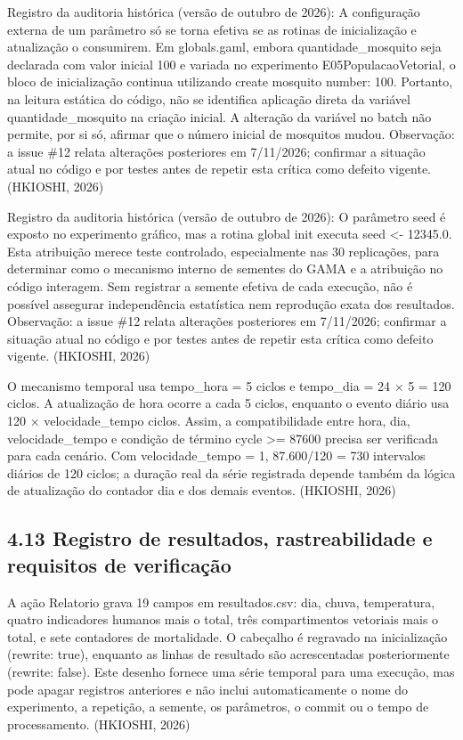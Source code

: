 Registro da auditoria histórica (versão de outubro de 2026): A
configuração externa de um parâmetro só se torna efetiva se as rotinas
de inicialização e atualização o consumirem. Em globals.gaml, embora
quantidade\_mosquito seja declarada com valor inicial 100 e variada no
experimento E05PopulacaoVetorial, o bloco de inicialização continua
utilizando create mosquito number: 100. Portanto, na leitura estática do
código, não se identifica aplicação direta da variável
quantidade\_mosquito na criação inicial. A alteração da variável no
batch não permite, por si só, afirmar que o número inicial de mosquitos
mudou. Observação: a issue \#12 relata alterações posteriores em
7/11/2026; confirmar a situação atual no código e por testes antes de
repetir esta crítica como defeito vigente. (HKIOSHI, 2026)

Registro da auditoria histórica (versão de outubro de 2026): O parâmetro
seed é exposto no experimento gráfico, mas a rotina global init executa
seed \textless- 12345.0. Esta atribuição merece teste controlado,
especialmente nas 30 replicações, para determinar como o mecanismo
interno de sementes do GAMA e a atribuição no código interagem. Sem
registrar a semente efetiva de cada execução, não é possível assegurar
independência estatística nem reprodução exata dos resultados.
Observação: a issue \#12 relata alterações posteriores em 7/11/2026;
confirmar a situação atual no código e por testes antes de repetir esta
crítica como defeito vigente. (HKIOSHI, 2026)

O mecanismo temporal usa tempo\_hora = 5 ciclos e tempo\_dia = 24 × 5 =
120 ciclos. A atualização de hora ocorre a cada 5 ciclos, enquanto o
evento diário usa 120 × velocidade\_tempo ciclos. Assim, a
compatibilidade entre hora, dia, velocidade\_tempo e condição de término
cycle \textgreater= 87600 precisa ser verificada para cada cenário. Com
velocidade\_tempo = 1, 87.600/120 = 730 intervalos diários de 120
ciclos; a duração real da série registrada depende também da lógica de
atualização do contador dia e dos demais eventos. (HKIOSHI, 2026)

\subsection{4.13 Registro de resultados, rastreabilidade e requisitos de
verificação}\label{registro-de-resultados-rastreabilidade-e-requisitos-de-verificauxe7uxe3o}

A ação Relatorio grava 19 campos em resultados.csv: dia, chuva,
temperatura, quatro indicadores humanos mais o total, três
compartimentos vetoriais mais o total, e sete contadores de mortalidade.
O cabeçalho é regravado na inicialização (rewrite: true), enquanto as
linhas de resultado são acrescentadas posteriormente (rewrite: false).
Este desenho fornece uma série temporal para uma execução, mas pode
apagar registros anteriores e não inclui automaticamente o nome do
experimento, a repetição, a semente, os parâmetros, o commit ou o tempo
de processamento. (HKIOSHI, 2026)

